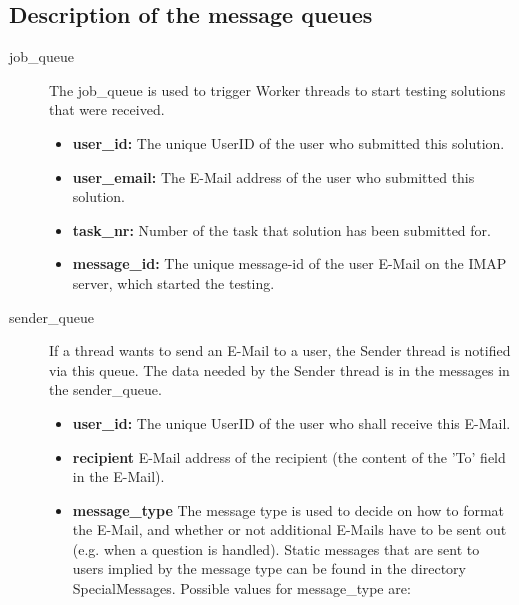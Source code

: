 \subsection{Description of the message queues} \label{app:queues}

\begin{description}
\item [job\_queue] The job\_queue is used to trigger Worker threads to start testing
    solutions that were received.
    \begin{itemize}
        \item {\bf user\_id:} The unique UserID of the user who submitted this solution.
        \item {\bf user\_email:} The E-Mail address of the user who submitted this solution.
        \item {\bf task\_nr:} Number of the task that solution has been submitted for.
        \item {\bf message\_id:} The unique message-id of the user E-Mail on the IMAP server,
            which started the testing.
    \end{itemize}

\item [sender\_queue] If a thread wants to send an E-Mail to a user, the Sender thread
    is notified via this queue. The data needed by the Sender thread is in the messages
    in the sender\_queue.
    \begin{itemize}
        \item {\bf user\_id:} The unique UserID of the user who shall receive this E-Mail.
        \item {\bf recipient} E-Mail address of the recipient (the content of the
            'To' field in the E-Mail).
        \item {\bf message\_type} The message type is used to decide on how to format
			the E-Mail, and whether or not additional E-Mails have to be sent
			out (e.g. when a question is handled). Static messages that are sent
			to users implied by the message type can be found in the directory
			SpecialMessages.  Possible values for message\_type are:


\end{itemize}
\end{description}
